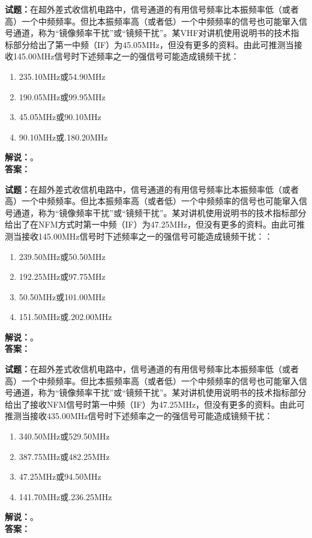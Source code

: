 \documentclass{ctexbook}
\begin{document}
\vspace{\baselineskip}

\noindent\textbf{试题：}在超外差式收信机电路中，信号通道的有用信号频率比本振频率低（或者高）一个中频频率。但比本振频率高（或者低）一个中频频率的信号也可能窜入信号通道，称为“镜像频率干扰”或“镜频干扰”。某VHF对讲机使用说明书的技术指标部分给出了第一中频（IF）为45.05\unit{\MHz}，但没有更多的资料。由此可推测当接收145.00\unit{\MHz}信号时下述频率之一的强信号可能造成镜频干扰：
\begin{enumerate}[leftmargin=3em]
  \item 235.10\unit{\MHz}或54.90\unit{\MHz}
  \item 190.05\unit{\MHz}或99.95\unit{\MHz}
  \item 45.05\unit{\MHz}或90.10\unit{\MHz}
  \item 90.10\unit{\MHz}或.180.20\unit{\MHz}
\end{enumerate}
\noindent\textbf{解说：}\textbf{}。\\\noindent\textbf{答案：}

\vspace{\baselineskip}

\noindent\textbf{试题：}在超外差式收信机电路中，信号通道的有用信号频率比本振频率低（或者高）一个中频频率。但比本振频率高（或者低）一个中频频率的信号也可能窜入信号通道，称为“镜像频率干扰”或“镜频干扰”。某对讲机使用说明书的技术指标部分给出了在NFM方式时第一中频（IF）为47.25\unit{\MHz}，但没有更多的资料。由此可推测当接收145.00\unit{\MHz}信号时下述频率之一的强信号可能造成镜频干扰：：
\begin{enumerate}[leftmargin=3em]
  \item 239.50\unit{\MHz}或50.50\unit{\MHz}
  \item 192.25\unit{\MHz}或97.75\unit{\MHz}
  \item 50.50\unit{\MHz}或101.00\unit{\MHz}
  \item 151.50\unit{\MHz}或.202.00\unit{\MHz}
\end{enumerate}
\noindent\textbf{解说：}\textbf{}。\\\noindent\textbf{答案：}

\vspace{\baselineskip}

\noindent\textbf{试题：}在超外差式收信机电路中，信号通道的有用信号频率比本振频率低（或者高）一个中频频率。但比本振频率高（或者低）一个中频频率的信号也可能窜入信号通道，称为“镜像频率干扰”或“镜频干扰”。某对讲机使用说明书的技术指标部分给出了接收NFM信号时第一中频（IF）为47.25\unit{\MHz}，但没有更多的资料。由此可推测当接收435.00\unit{\MHz}信号时下述频率之一的强信号可能造成镜频干扰：
\begin{enumerate}[leftmargin=3em]
  \item 340.50\unit{\MHz}或529.50\unit{\MHz}
  \item 387.75\unit{\MHz}或482.25\unit{\MHz}
  \item 47.25\unit{\MHz}或94.50\unit{\MHz}
  \item 141.70\unit{\MHz}或.236.25\unit{\MHz}
\end{enumerate}
\noindent\textbf{解说：}\textbf{}。\\\noindent\textbf{答案：}
\end{document}
